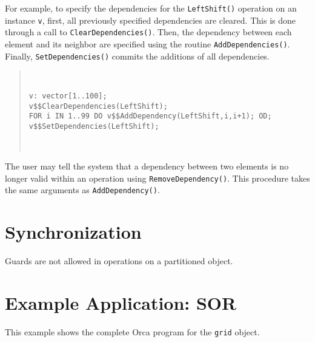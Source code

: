 \documentclass{article}
\newenvironment{example}
  {\begin{quote} ~\hrulefill }
  {~\hrulefill \end{quote} }
\begin{document}
For example, to specify the dependencies for the \verb+LeftShift()+
operation on an instance \verb+v+, first, all previously specified
dependencies are cleared. This is done through a call to
\verb+ClearDependencies()+. Then, the dependency between each element
and its neighbor are specified using the routine
\verb+AddDependencies()+. Finally, \verb+SetDependencies()+
commits the additions of all dependencies.

\begin{example}
\begin{verbatim}
v: vector[1..100];
v$$ClearDependencies(LeftShift);
FOR i IN 1..99 DO v$$AddDependency(LeftShift,i,i+1); OD;
v$$SetDependencies(LeftShift);
\end{verbatim}
\end{example}
\remark{$$}

The user may tell the system that a dependency between two elements is
no longer valid within an operation using
\verb+RemoveDependency()+. This procedure takes the same arguments as
\verb+AddDependency()+.

\section{Synchronization}

Guards are not allowed in operations on a partitioned object.

\newpage
\appendix

\section{Example Application: SOR}
\label{examples}

This example shows the complete Orca program for the \verb+grid+
object.
\end{document}

